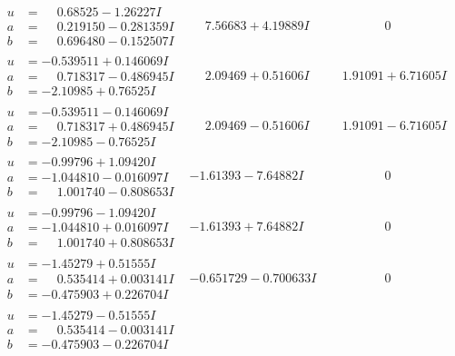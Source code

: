 \documentclass[1p]{elsarticle_modified}
\theoremstyle{definition}
\begin{document}
$$\begin{array}{c|c|c}
\begin{aligned}
u &= \phantom{-}0.68525 - 1.26227 I \\
a &= \phantom{-}0.219150 - 0.281359 I \\
b &= \phantom{-}0.696480 - 0.152507 I\end{aligned}
 & \phantom{-}7.56683 + 4.19889 I & \phantom{-0.000000 } 0 \\ \hline\begin{aligned}
u &= -0.539511 + 0.146069 I \\
a &= \phantom{-}0.718317 - 0.486945 I \\
b &= -2.10985 + 0.76525 I\end{aligned}
 & \phantom{-}2.09469 + 0.51606 I & \phantom{-}1.91091 + 6.71605 I \\ \hline\begin{aligned}
u &= -0.539511 - 0.146069 I \\
a &= \phantom{-}0.718317 + 0.486945 I \\
b &= -2.10985 - 0.76525 I\end{aligned}
 & \phantom{-}2.09469 - 0.51606 I & \phantom{-}1.91091 - 6.71605 I \\ \hline\begin{aligned}
u &= -0.99796 + 1.09420 I \\
a &= -1.044810 - 0.016097 I \\
b &= \phantom{-}1.001740 - 0.808653 I\end{aligned}
 & -1.61393 - 7.64882 I & \phantom{-0.000000 } 0 \\ \hline\begin{aligned}
u &= -0.99796 - 1.09420 I \\
a &= -1.044810 + 0.016097 I \\
b &= \phantom{-}1.001740 + 0.808653 I\end{aligned}
 & -1.61393 + 7.64882 I & \phantom{-0.000000 } 0 \\ \hline\begin{aligned}
u &= -1.45279 + 0.51555 I \\
a &= \phantom{-}0.535414 + 0.003141 I \\
b &= -0.475903 + 0.226704 I\end{aligned}
 & -0.651729 - 0.700633 I & \phantom{-0.000000 } 0 \\ \hline\begin{aligned}
u &= -1.45279 - 0.51555 I \\
a &= \phantom{-}0.535414 - 0.003141 I \\
b &= -0.475903 - 0.226704 I\end{aligned}

\end{array}$$
\end{document}
